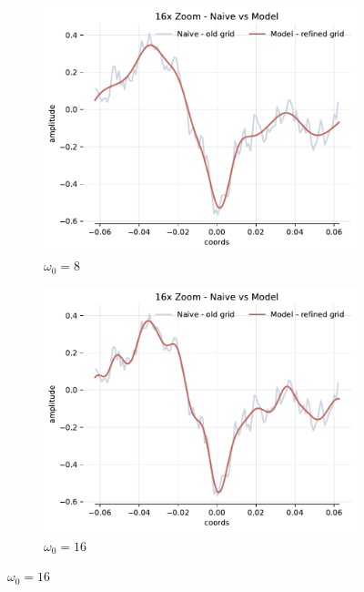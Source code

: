 \begin{figure}[h]
    \centering
    \begin{subfigure}[b]{0.32\textwidth}
        \centering
        \includegraphics[width=\textwidth]{img/ch3/16x-zoom-1hl-32hf-8hz.pdf}
        \caption{$\omega_0=8$}
        \label{fig:16x-zoom-1hl-32hf-8hz}
    \end{subfigure}
    \begin{subfigure}[b]{0.32\textwidth}
        \centering
        \includegraphics[width=\textwidth]{img/ch3/16x-zoom-1hl-32hf-16hz.pdf}
        \caption{$\omega_0=16$}
        \label{fig:16x-zoom-1hl-32hf-16hz}
    \end{subfigure}

\end{figure}
